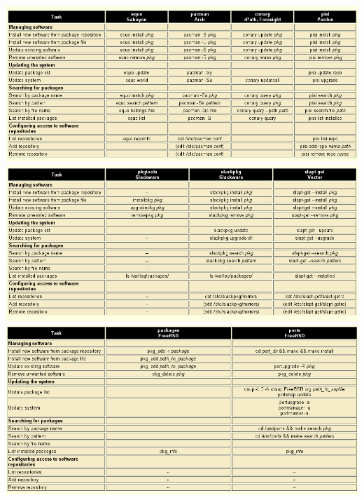 \begin{center}
\includegraphics[scale=0.5]{src/package_managers_5.png}
\includegraphics[scale=0.5]{src/package_managers_6.png}
\includegraphics[scale=0.5]{src/package_managers_7.png}
\end{center}

